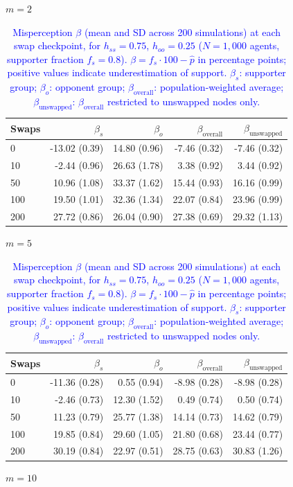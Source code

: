\begin{table}[H]
\centering
\caption{\textcolor{blue}{Misperception $\beta$ (mean and SD across 200 simulations) at each swap checkpoint, for $h_{ss} = 0.75$, $h_{oo} = 0.25$ ($N = 1{,}000$ agents, supporter fraction $f_s = 0.8$). $\beta = f_s \cdot 100 - \hat{p}$ in percentage points; positive values indicate underestimation of support. $\beta_s$: supporter group; $\beta_o$: opponent group; $\beta_{\mathrm{overall}}$: population-weighted average; $\beta_{\mathrm{unswapped}}$: $\beta_{\mathrm{overall}}$ restricted to unswapped nodes only.}}
\label{tab:subset_fs08_hss750_hoo250}
\par\medskip
\noindent\textit{$m = 2$}\\[2pt]
\begin{tabular}{l rrrr}
\toprule
Swaps & $\beta_s$ & $\beta_o$ & $\beta_{\mathrm{overall}}$ & $\beta_{\mathrm{unswapped}}$ \\
\midrule
0 & -13.02 (0.39) & 14.80 (0.96) & -7.46 (0.32) & -7.46 (0.32) \\
10 & -2.44 (0.96) & 26.63 (1.78) & 3.38 (0.92) & 3.44 (0.92) \\
50 & 10.96 (1.08) & 33.37 (1.62) & 15.44 (0.93) & 16.16 (0.99) \\
100 & 19.50 (1.01) & 32.36 (1.34) & 22.07 (0.84) & 23.96 (0.99) \\
200 & 27.72 (0.86) & 26.04 (0.90) & 27.38 (0.69) & 29.32 (1.13) \\
\bottomrule
\end{tabular}
\par\medskip
\noindent\textit{$m = 5$}\\[2pt]
\begin{tabular}{l rrrr}
\toprule
Swaps & $\beta_s$ & $\beta_o$ & $\beta_{\mathrm{overall}}$ & $\beta_{\mathrm{unswapped}}$ \\
\midrule
0 & -11.36 (0.28) & 0.55 (0.94) & -8.98 (0.28) & -8.98 (0.28) \\
10 & -2.46 (0.73) & 12.30 (1.52) & 0.49 (0.74) & 0.50 (0.74) \\
50 & 11.23 (0.79) & 25.77 (1.38) & 14.14 (0.73) & 14.62 (0.79) \\
100 & 19.85 (0.84) & 29.60 (1.05) & 21.80 (0.68) & 23.44 (0.77) \\
200 & 30.19 (0.84) & 22.97 (0.51) & 28.75 (0.63) & 30.83 (1.26) \\
\bottomrule
\end{tabular}
\par\medskip
\noindent\textit{$m = 10$}\\[2pt]

\end{table}
